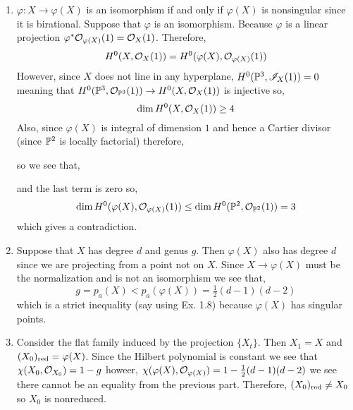 \documentclass[12pt]{article}
\begin{document}
\begin{enumerate}
\item $\varphi : X \to \varphi(X)$ is an isomorphism if and only if $\varphi(X)$ is nonsingular since it is birational. Suppose that $\varphi$ is an isomorphism. Because $\varphi$ is a linear projection $\varphi^* \struct{\varphi(X)}(1) = \struct{X}(1)$. Therefore, 
\[ H^0(X, \struct{X}(1)) = H^0(\varphi(X), \struct{\varphi(X)}(1)) \]
However, since $X$ does not line in any hyperplane, $H^0(\P^3, \I_X(1)) = 0$ meaning that $H^0(\P^3, \struct{\P^3}(1)) \to H^0(X, \struct{X}(1))$ is injective so,
\[ \dim H^0(X, \struct{X}(1)) \ge 4 \]
Also, since $\varphi(X)$ is integral of dimension $1$ and hence a Cartier divisor (since $\P^2$ is locally factorial) therefore, 
\begin{center}
\end{center}
so we see that,
\begin{center}
\end{center}
and the last term is zero so,
\[ \dim H^0(\varphi(X), \struct{\varphi(X)}(1)) \le \dim H^0(\P^2, \struct{\P^2}(1)) = 3 \]
which gives a contradiction.

\item Suppose that $X$ has degree $d$ and genus $g$. Then $\varphi(X)$ also has degree $d$ since we are projecting from a point not on $X$. Since $X \to \varphi(X)$ must be the normalization and is not an isomorphism we see that,
\[ g = p_a(X) < p_a(\varphi(X)) = \tfrac{1}{2} (d-1)(d-2) \]
which is a strict inequality (say using Ex. 1.8) because $\varphi(X)$ has singular points. 

\item Consider the flat family induced by the projection $\{ X_t \}$. Then $X_1 = X$ and $(X_0)_{\red} = \varphi(X)$. Since the Hilbert polynomial is constant we see that $\chi(X_0, \struct{X_0}) = 1 - g$ howeer, $\chi(\varphi(X), \struct{\varphi(X)}) = 1 - \tfrac{1}{2} (d - 1)(d-2)$ we see there cannot be an equality from the previous part. Therefore, $(X_0)_{\red} \neq X_0$ so $X_0$ is nonreduced.  
\end{enumerate}
\end{document}

